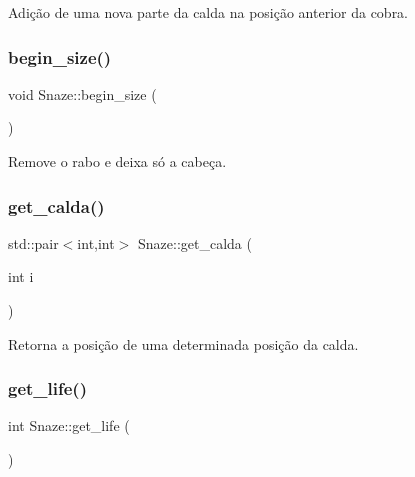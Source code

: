 Adição de uma nova parte da calda na posição anterior da cobra. 

\mbox{\label{classSnaze_ad9ec515cbd75483373a1919dd321b5ad}} 
\subsubsection{\texorpdfstring{begin\+\_\+size()}{begin\_size()}}
{\footnotesize\ttfamily void Snaze\+::begin\+\_\+size (\begin{DoxyParamCaption}{ }\end{DoxyParamCaption})\hspace{0.3cm}{\ttfamily [inline]}}



Remove o rabo e deixa só a cabeça. 

\mbox{\label{classSnaze_aa3cfb02da86f2d37c632a6e4a720722e}} 
\subsubsection{\texorpdfstring{get\+\_\+calda()}{get\_calda()}}
{\footnotesize\ttfamily std\+::pair$<$int,int$>$ Snaze\+::get\+\_\+calda (\begin{DoxyParamCaption}\item[{int}]{i }\end{DoxyParamCaption})\hspace{0.3cm}{\ttfamily [inline]}}



Retorna a posição de uma determinada posição da calda. 

\mbox{\label{classSnaze_a9c5c5706980645098dc478bc6fe255a5}} 
\subsubsection{\texorpdfstring{get\+\_\+life()}{get\_life()}}
{\footnotesize\ttfamily int Snaze\+::get\+\_\+life (\begin{DoxyParamCaption}{ }\end{DoxyParamCaption})\hspace{0.3cm}{\ttfamily [inline]}}



